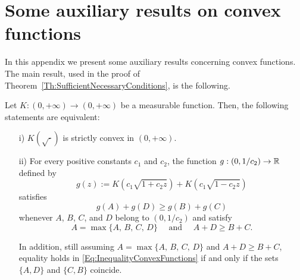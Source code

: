 \section{Some auxiliary results on convex functions}
\label{Sec:AuxiliaryResults}

In this appendix we present some auxiliary results concerning convex functions. The main result, used in the proof of Theorem~\ref{Th:SufficientNecessaryConditions}, is the following.



\begin{proposition}
	\label{Prop:EquivalenceK(sqrt)Convex<->Inequality}
	Let $K:(0, +\infty) \to (0,+\infty)$ be a measurable function. Then, the following statements are equivalent:
	\begin{enumerate}
		\item[i)] $K(\sqrt{\cdot})$ is strictly convex in $(0, +\infty)$.
		\item[ii)] For every positive constants $c_1$ and $c_2$, the function $g:(0,1/c_2)\to \mathbb{R}$ defined by
		\begin{equation}
		\label{Eq:DefinitiongFromK}
		g(z) := K(c_1 \sqrt{1 + c_2z}) + K(c_1 \sqrt{1 - c_2z})
		\end{equation}
		satisfies 
		\begin{equation}
		\label{Eq:InequalityConvexFunctions}
		g(A) + g(D) \geq g(B) + g(C)
		\end{equation}
		whenever $A$, $B$, $C$, and $D$ belong to $(0, 1/c_2)$ and satisfy
		$$
		A = \max\{A,\, B,\, C,\, D\} \quad \text{ and } \quad A + D \geq B + C.
		$$
		
		In addition, still assuming $A = \max\{A,\, B,\, C,\, D\}$ and $A + D \geq B + C$, equality holds in \eqref{Eq:InequalityConvexFunctions} if and only if the sets $\{A,D\}$ and $\{C,B\}$ coincide.	
	\end{enumerate}
\end{proposition}



